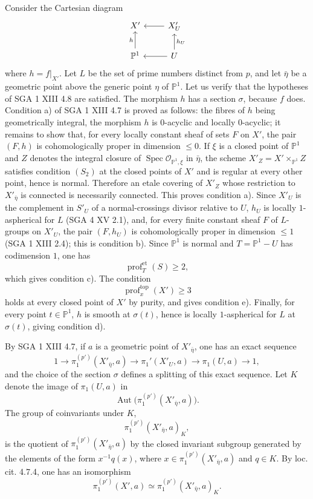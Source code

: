 \documentclass[11pt]{article}
\providecommand{\Spec}{\operatorname{Spec}}
\providecommand{\Aut}{\operatorname{Aut}}
\providecommand{\cO}{\mathcal O}
\providecommand{\et}{\mathrm{et}}
\providecommand{\prof}{\operatorname{prof}}
\begin{document}
Consider the Cartesian diagram
\[
\begin{tikzcd}
X' & X'_U \arrow[l]\\
\mathbb P^1 \arrow[u,"h"] & U \arrow[l] \arrow[u,"h_U"']
\end{tikzcd}
\]
where $h=f|_{X'}$. Let $L$ be the set of prime numbers distinct from $p$, and let $\bar\eta$ be a geometric point above the generic point $\eta$ of $\mathbb P^1$. Let us verify that the hypotheses of SGA 1 XIII 4.8 are satisfied. The morphism $h$ has a section $\sigma$, because $f$ does. Condition a) of SGA 1 XIII 4.7 is proved as follows: the fibres of $h$ being geometrically integral, the morphism $h$ is $0$-acyclic and locally $0$-acyclic; it remains to show that, for every locally constant sheaf of sets $F$ on $X'$, the pair $(F,h)$ is cohomologically proper in dimension $\le0$. If $\xi$ is a closed point of $\mathbb P^1$ and $Z$ denotes the integral closure of $\Spec \cO_{\mathbb P^1,\xi}$ in $\bar\eta$, the scheme $X'_Z=X'\times_{\mathbb P^1}Z$ satisfies condition $(S_2)$ at the closed points of $X'$ and is regular at every other point, hence is normal. Therefore an etale covering of $X'_Z$ whose restriction to $X'_{\bar\eta}$ is connected is necessarily connected. This proves condition a). Since $X'_U$ is the complement in $S'_U$ of a normal-crossings divisor relative to $U$, $h_U$ is locally $1$-aspherical for $L$ (SGA 4 XV 2.1), and, for every finite constant sheaf $F$ of $L$-groups on $X'_U$, the pair $(F,h_U)$ is cohomologically proper in dimension $\le1$ (SGA 1 XIII 2.4); this is condition b). Since $\mathbb P^1$ is normal and $T=\mathbb P^1-U$ has codimension $1$, one has
\[
 \prof^{\et}_T(S)\ge2,
\]
which gives condition c). The condition
\[
 \prof^{\mathrm{top}}_x(X')\ge3
\]
holds at every closed point of $X'$ by purity, and gives condition e). Finally, for every point $t\in\mathbb P^1$, $h$ is smooth at $\sigma(t)$, hence is locally $1$-aspherical for $L$ at $\sigma(t)$, giving condition d).

By SGA 1 XIII 4.7, if $a$ is a geometric point of $X'_{\bar\eta}$, one has an exact sequence
\[
1\longrightarrow \pi_1^{(p')}(X'_{\bar\eta},a)
\longrightarrow \pi_1'(X'_U,a)
\longrightarrow \pi_1(U,a)
\longrightarrow 1,
\]
and the choice of the section $\sigma$ defines a splitting of this exact sequence. Let $K$ denote the image of $\pi_1(U,a)$ in
\[
 \Aut\bigl(\pi_1^{(p')}(X'_{\bar\eta},a)\bigr).
\]
The group of coinvariants under $K$,
\[
 \pi_1^{(p')}(X'_{\bar\eta},a)_K,
\]
is the quotient of $\pi_1^{(p')}(X'_{\bar\eta},a)$ by the closed invariant subgroup generated by the elements of the form $x^{-1}q(x)$, where $x\in\pi_1^{(p')}(X'_{\bar\eta},a)$ and $q\in K$. By loc. cit. 4.7.4, one has an isomorphism
\[
 \pi_1^{(p')}(X',a)\simeq \pi_1^{(p')}(X'_{\bar\eta},a)_K.
\]
\end{document}
